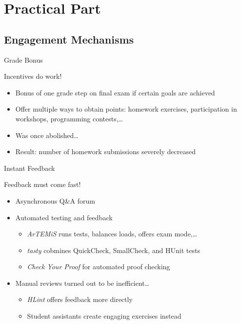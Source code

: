 \documentclass{beamer}
\begin{document}
\section{Practical Part}
\subsection{Engagement Mechanisms}
\begin{frame}{Grade Bonus}
\centerline{\Large{\alert{Incentives do work!}}}
\pause
\begin{itemize}[<+->]
\item Bonus of one grade step on final exam if certain goals are achieved
\item Offer multiple ways to obtain points: homework exercises, participation in workshops, programming contests,\dots
\item Was once abolished\dots\\
\item[] Result: number of homework submissions severely decreased
\end{itemize}
\end{frame}

\begin{frame}{Instant Feedback}
\centerline{\Large{\alert{Feedback must come fast!}}}
\pause
\begin{itemize}[<+->]
\item Asynchronous Q\&A forum
\item Automated testing and feedback
\begin{itemize}
  \item \emph{ArTEMiS} runs tests, balances loads, offers exam mode,\dots
  \item \emph{tasty} cobmines QuickCheck, SmallCheck, and HUnit tests
  \item \emph{Check Your Proof} for automated proof checking
\end{itemize}
\item Manual reviews turned out to be inefficient\dots
\begin{itemize}
  \item \emph{HLint} offers feedback more directly
  \item Student assistants create engaging exercises instead
\end{itemize}
\end{itemize}
\end{frame}
\end{document}
